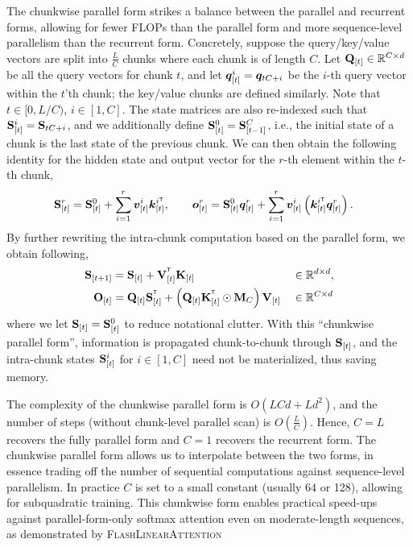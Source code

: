 The chunkwise parallel form \cite{hua_transformer_2022,sun2023retentive,yang_gated_2023} strikes a balance between the parallel and recurrent forms,  allowing for fewer FLOPs than the parallel form and more sequence-level parallelism than the recurrent form. Concretely, suppose the query/key/value vectors are split into $\frac{L}{C}$ chunks where each chunk is of length $C$. Let ${\mathbf{Q}}_{[t]} \in \mathbb{R}^{C \times d}$ be all the query vectors for chunk $t$, and let  ${\bm{q}}_{[t]}^i = {\bm{q}}_{t  C + i}$ be the $i$-th query vector within the $t$'th chunk; the key/value chunks are defined similarly.   Note that $t \in [0, L/C)$, $i \in [1, C]$. The state matrices are also re-indexed such that ${\mathbf{S}}_{[t]}^i = {\mathbf{S}}_{tC + i}$, and we additionally define ${\mathbf{S}}_{[t]}^0 = {\mathbf{S}}_{[t-1]}^C$, i.e., the initial state of a chunk is the last state of the previous chunk. We can then obtain the following identity for the hidden state and output vector for the $r$-th element within the $t$-th chunk,
\begin{align*}
    \rmS_{[t]}^r &= \rmS_{[t]}^0 + \sum_{i=1}^{r} \vv_{[t]}^i \vk_{[t]}^{i\intercal}, \qquad 
    \vo_{[t]}^r =  \rmS_{[t]}^0 \vq_{[t]}^r + \sum_{i=1}^{r} \vv_{[t]}^i \left(\vk_{[t]}^{i\intercal}\vq_{[t]}^r \right). 
    \end{align*}
By further rewriting the intra-chunk computation based on the parallel form, we  obtain following,
    \begin{align} 
 \rmS_{[t+1]} &= \rmS_{[t]} + \rmV_{[t]}^\intercal \rmK_{[t]}  && \in \mathbb{R}^{d\times d} \label{eq:linear_attn_h}, \\ \rmO_{[t]} &= \rmQ_{[t]}  \rmS_{[t]}^{\intercal} + \left(\rmQ_{[t]}\rmK_{[t]}^\intercal \odot \rmM_C \right) \rmV_{[t]} && \in \mathbb{R}^{C\times d} \label{eq:linear_attn_o}
\end{align}
where we let ${\mathbf{S}}_{[t]}={\mathbf{S}}_{[t]}^0$ to reduce notational clutter. With this  ``chunkwise parallel form'', information is propagated chunk-to-chunk through ${\mathbf{S}}_{[t]}$, and the intra-chunk states ${\mathbf{S}}^i_{[t]}$ for $i \in [1, C]$ need not be materialized, thus saving memory.


The  complexity of the chunkwise parallel form is $O(LCd + Ld^2)$, and the number of steps (without chunk-level parallel scan) is $O(\frac{L}{C})$. Hence, $C =L$ recovers the fully parallel form and $C=1$ recovers the recurrent form. The chunkwise parallel form  allows us to interpolate between the two forms, in essence trading off the number of sequential computations against sequence-level parallelism. In practice $C$ is set to a small constant (usually 64 or 128), allowing for subquadratic training. This chunkwise form enables practical speed-ups against parallel-form-only softmax attention even on moderate-length sequences, as demonstrated by \textsc{FlashLinearAttention} \cite{yang_gated_2023,yang_fla_2024}

